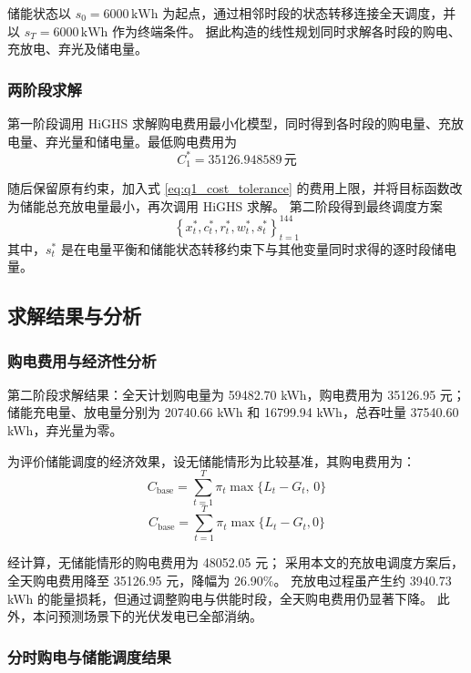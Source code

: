 储能状态以 \(s_0=6000\,\mathrm{kWh}\) 为起点，通过相邻时段的状态转移连接全天调度，并以 \(s_T=6000\,\mathrm{kWh}\) 作为终端条件。
据此构造的线性规划同时求解各时段的购电、充放电、弃光及储电量。
\subsubsection{两阶段求解}

第一阶段调用 HiGHS 求解购电费用最小化模型，同时得到各时段的购电量、充放电量、弃光量和储电量。最低购电费用为
\begin{equation}
    C_1^\ast
    =
    35126.948589\,\mathrm{元}
    \label{eq:q1_stage1_result}
\end{equation}

随后保留原有约束，加入式 \eqref{eq:q1_cost_tolerance} 的费用上限，并将目标函数改为储能总充放电量最小，再次调用 HiGHS 求解。
第二阶段得到最终调度方案
\[
\left\{
x_t^\ast,c_t^\ast,r_t^\ast,w_t^\ast,s_t^\ast
\right\}_{t=1}^{144}
\]
其中，\(s_t^\ast\) 是在电量平衡和储能状态转移约束下与其他变量同时求得的逐时段储电量。

\subsection{求解结果与分析}

\subsubsection{购电费用与经济性分析}
第二阶段求解结果：全天计划购电量为 59482.70 kWh，购电费用为 35126.95 元；储能充电量、放电量分别为 20740.66 kWh 和 16799.94 kWh，总吞吐量 37540.60 kWh，弃光量为零。

为评价储能调度的经济效果，设无储能情形为比较基准，其购电费用为：
\begin{equation}
C_{\mathrm{base}}=\sum_{t=1}^{T}\pi_t\max\{L_t-G_t,\,0\}
\label{eq:base}
\end{equation}
\begin{equation}
    C_{\mathrm{base}}
    =
    \sum_{t=1}^{T}\pi_t\max\{L_t-G_t,0\}
    \label{eq:q1_baseline_cost}
\end{equation}

经计算，无储能情形的购电费用为 48052.05 元；
采用本文的充放电调度方案后，全天购电费用降至 35126.95 元，降幅为 26.90\%。
充放电过程虽产生约 3940.73 kWh 的能量损耗，但通过调整购电与供能时段，全天购电费用仍显著下降。
此外，本问预测场景下的光伏发电已全部消纳。

\subsubsection{分时购电与储能调度结果}

